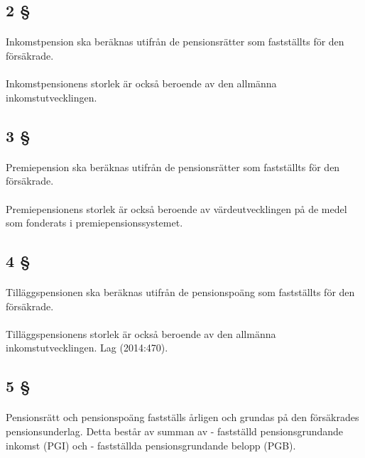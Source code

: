 \documentclass[a4paper,notitlepage,openany,10pt]{book}
\begin{document}
\subsection*{2 §}
\paragraph*{}
Inkomstpension ska beräknas utifrån de pensionsrätter som fastställts för den försäkrade.
\paragraph*{}
Inkomstpensionens storlek är också beroende av den allmänna inkomstutvecklingen.
\subsection*{3 §}
\paragraph*{}
Premiepension ska beräknas utifrån de pensionsrätter som fastställts för den försäkrade.
\paragraph*{}
Premiepensionens storlek är också beroende av värdeutvecklingen på de medel som fonderats i premiepensionssystemet.
\subsection*{4 §}
\paragraph*{}
Tilläggspensionen ska beräknas utifrån de pensionspoäng som fastställts för den försäkrade.
\paragraph*{}
Tilläggspensionens storlek är också beroende av den allmänna inkomstutvecklingen.
Lag (2014:470).
\subsection*{5 §}
\paragraph*{}
Pensionsrätt och pensionspoäng fastställs årligen och grundas på den försäkrades pensionsunderlag. Detta består av summan av
\newline - fastställd pensionsgrundande inkomst (PGI) och
\newline - fastställda pensionsgrundande belopp (PGB).
\end{document}

